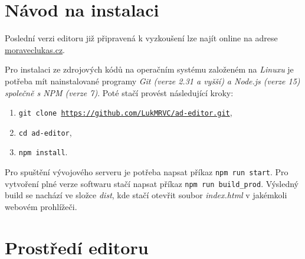 \documentclass[czech,bachelor]{diploma}
\begin{document}
\MakeTitlePages









\printbibliography[title={Literatura}, heading=bibintoc]

\appendix
\chapter{Návod na instalaci}\label{chap:appendix-1}
Poslední verzi editoru již připravená k vyzkoušení lze najít online na adrese \href{https://moraveclukas.cz}{moraveclukas.cz}.

Pro instalaci ze zdrojových kódů na operačním systému založeném na \emph{Linuxu} je potřeba mít nainstalované programy 
\emph{Git (verze 2.31 a vyšší) a Node.js (verze 15) společně s NPM (verze 7)}.
Poté stačí provést následující kroky:
\begin{enumerate}
    \item \texttt{git clone \href{https://github.com/LukMRVC/ad-editor.git}{https://github.com/LukMRVC/ad-editor.git}},
    \item \texttt{cd ad-editor},
    \item \texttt{npm install}.
\end{enumerate}
Pro spuštění vývojového serveru je potřeba napsat příkaz \texttt{npm run start}.
Pro vytvoření plné verze softwaru stačí napsat příkaz \texttt{npm run build\_prod}. Výsledný build se nachází ve složce \emph{dist}, kde stačí
otevřit soubor \emph{index.html} v jakémkoli webovém prohlížeči.

% 
\chapter{Prostředí editoru}\label{chap:appendix-1}
\end{document}
